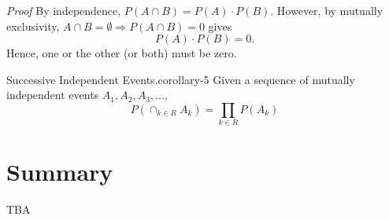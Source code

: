 \documentclass[10pt,]{book}
\makeatletter
\renewcommand*{\proofname}{Proof}
\renewenvironment{proof}[1][\proofname]{\par
  \pushQED{\qed}%
  \normalfont \topsep6\p@\@plus6\p@\relax
  \trivlist
  \item\relax
    {\itshape
    #1\@addpunct{.}}\hspace\labelsep\ignorespaces
}{%
  \popQED\endtrivlist\@endpefalse
}
\numberwithin{equation}{section}
\makeatother
\begin{document}
\begin{proof}\hypertarget{proof-23}{}
\hypertarget{p-598}{}%
By independence, \(P(A \cap B) = P(A) \cdot P(B)\). However, by mutually exclusivity, \(A \cap B = \emptyset \Rightarrow P(A \cap B) = 0\) gives%
\begin{equation*}
P(A) \cdot P(B) = 0.
\end{equation*}
Hence, one or the other (or both) must be zero.%
\end{proof}
%
\par
\hypertarget{p-599}{}%
\begin{corollary}{Successive Independent Events.}{}{corollary-5}%
\hypertarget{p-600}{}%
Given a sequence of mutually independent events \(A_1, A_2, A_3, ...\),%
\begin{equation*}
P(\cap_{k \in R} A_k) = \prod_{k \in R} P(A_k)
\end{equation*}
%
\end{corollary}
%
%
%
\typeout{************************************************}
\typeout{************************************************}
%
\section[{Summary}]{Summary}\label{section-30}
\hypertarget{p-601}{}%
TBA%
%
%
\typeout{************************************************}
\typeout{************************************************}
%
\end{document}

